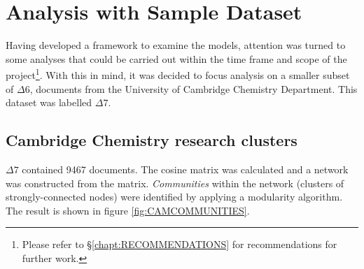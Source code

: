\chapter{Analysis with Sample Dataset}
\addtocounter{page}{1}
\label{chapt:ANALYSIS}
Having developed a framework to examine the models, attention was turned to some analyses that could be carried out within the time frame and scope of the project\footnote{Please refer to  \S\ref{chapt:RECOMMENDATIONS} for recommendations for further work.}. With this in mind, it was decided to focus analysis on a smaller subset of $\Delta6$, documents from the University of Cambridge Chemistry Department. This dataset was labelled $\Delta7$.
\section{Cambridge Chemistry research clusters}
\label{sec:RESEARCHCLUSTERS}
$\Delta7$ contained 9467 documents. The cosine matrix was calculated and a network was constructed from the matrix. \emph{Communities} within the network (clusters of strongly-connected nodes) were identified by applying a modularity algorithm\cite{modularity1}\cite{modularity2}. The result is shown in figure \ref{fig:CAMCOMMUNITIES}.

